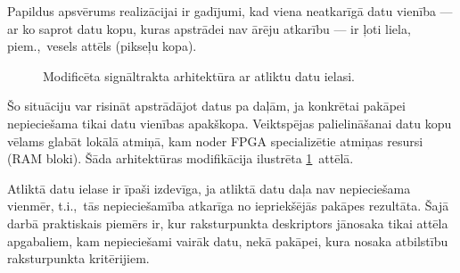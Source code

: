 Papildus apsvērums realizācijai ir gadījumi, kad viena neatkarīgā datu vienība
--- ar ko saprot datu kopu, kuras apstrādei nav ārēju atkarību --- ir
ļoti liela, piem.,~vesels attēls (pikseļu kopa).
\begin{figure}[tbh]
	\centering
	\def\svgscale{1.2}
	{}
	\caption{Modificēta signāltrakta arhitektūra ar atliktu datu ielasi.}
	\label{fig:fpga-arch2}
\end{figure}
Šo situāciju var risināt apstrādājot datus pa daļām, ja konkrētai pakāpei
nepieciešama tikai datu vienības apakškopa. Veiktspējas palielināšanai datu
kopu vēlams glabāt lokālā atmiņā, kam noder FPGA specializētie atmiņas
resursi (RAM bloki). Šāda arhitektūras modifikācija ilustrēta
\ref{fig:fpga-arch2}~attēlā.

Atliktā datu ielase ir īpaši izdevīga, ja
atliktā datu daļa nav nepieciešama vienmēr, t.i.,~tās nepieciešamība
atkarīga no iepriekšējās pakāpes rezultāta.
Šajā darbā praktiskais piemērs ir, kur raksturpunkta deskriptors
jānosaka tikai attēla apgabaliem, kam nepieciešami vairāk datu, nekā pakāpei,
kura nosaka atbilstību raksturpunkta kritērijiem.


